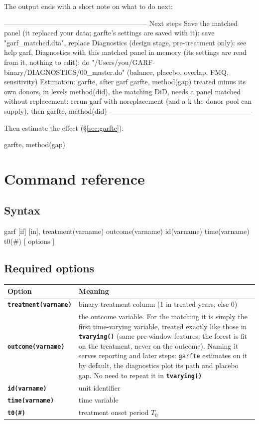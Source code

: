 \documentclass[11pt,a4paper]{article}
\newcommand{\opt}[1]{\texttt{\textbf{#1}}}
\newcommand{\code}[1]{\texttt{#1}}
\begin{document}
The output ends with a short note on what to do next:
\begin{console}
--------------------------------------------------------------
Next steps
  Save the matched panel (it replaced your data; garfte's settings are saved with it):
     save "garf_matched.dta", replace
  Diagnostics (design stage, pre-treatment only): see help garf, Diagnostics
     with this matched panel in memory (its settings are read from it, nothing to edit):
     do "/Users/you/GARF-binary/DIAGNOSTICS/00_master.do"   (balance, placebo, overlap, FMQ, sensitivity)
  Estimation: garfte, after garf
     garfte, method(gap)   treated minus its own donors, in levels
     method(did), the matching DiD, needs a panel matched without replacement:
     rerun garf with noreplacement (and a k the donor pool can supply), then garfte, method(did)
--------------------------------------------------------------
\end{console}
Then estimate the effect (\S\ref{sec:garfte}):
\begin{stata}
garfte, method(gap)
\end{stata}

\section{Command reference}

\subsection{Syntax}
\begin{stata}
garf [if] [in], treatment(varname) outcome(varname) id(varname)
     time(varname) t0(#) [ options ]
\end{stata}

\subsection{Required options}
\begin{tabularx}{\textwidth}{@{}lX@{}}
\toprule
Option & Meaning\\
\midrule
\opt{treatment(varname)} & binary treatment column (1 in treated years, else 0)\\
\opt{outcome(varname)}   & the outcome variable. For the matching it is simply the first time-varying variable, treated exactly like those in \opt{tvarying()} (same pre-window features; the forest is fit on the treatment, never on the outcome). Naming it serves reporting and later steps: \code{garfte} estimates on it by default, the diagnostics plot its path and placebo gap. No need to repeat it in \opt{tvarying()}\\
\opt{id(varname)}        & unit identifier\\
\opt{time(varname)}      & time variable\\
\opt{t0(\#)}             & treatment onset period $T_0$\\
\bottomrule
\end{tabularx}
\end{document}
